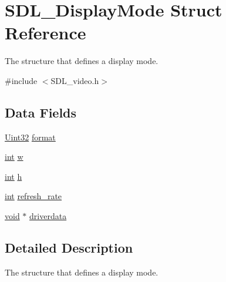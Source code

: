 \hypertarget{struct_s_d_l___display_mode}{}\section{S\+D\+L\+\_\+\+Display\+Mode Struct Reference}
\label{struct_s_d_l___display_mode}


The structure that defines a display mode.  




{\ttfamily \#include $<$S\+D\+L\+\_\+video.\+h$>$}

\subsection*{Data Fields}
\begin{DoxyCompactItemize}
\item 
\hyperlink{_s_d_l__stdinc_8h_add440eff171ea5f55cb00c4a9ab8672d}{Uint32} \hyperlink{struct_s_d_l___display_mode_a564cec93e3c28ae1ff8340e1079ff385}{format}
\item 
\hyperlink{_s_d_l__thread_8h_a6a64f9be4433e4de6e2f2f548cf3c08e}{int} \hyperlink{struct_s_d_l___display_mode_aac374e320caaadeca4874add33b62af2}{w}
\item 
\hyperlink{_s_d_l__thread_8h_a6a64f9be4433e4de6e2f2f548cf3c08e}{int} \hyperlink{struct_s_d_l___display_mode_a16611451551e3d15916bae723c3f59f7}{h}
\item 
\hyperlink{_s_d_l__thread_8h_a6a64f9be4433e4de6e2f2f548cf3c08e}{int} \hyperlink{struct_s_d_l___display_mode_a1885d5e794c0f216ec6dfdeb5933e4b5}{refresh\+\_\+rate}
\item 
\hyperlink{_s_d_l__audio_8h_a52835ae37c4bb905b903cbaf5d04b05f}{void} $\ast$ \hyperlink{struct_s_d_l___display_mode_a9171ccac35ae6bd1b4984ad1166a8743}{driverdata}
\end{DoxyCompactItemize}


\subsection{Detailed Description}
The structure that defines a display mode. 

